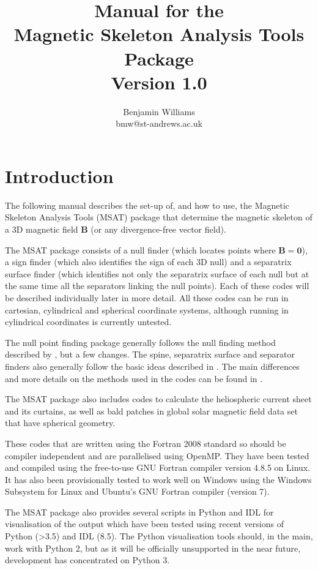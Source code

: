 \documentclass[12pt]{article}
\author{Benjamin Williams \\ bmw@st-andrews.ac.uk}
\title{Manual for the \\ Magnetic Skeleton Analysis Tools Package \\ \( \; \) \\ Version 1.0}
\renewcommand{\vec}[1]{\mathbf{#1}}
\begin{document}
  \maketitle

  \tableofcontents

  \newpage

  \section{Introduction}

    The following manual describes the set-up of, and how to use, the Magnetic Skeleton Analysis Tools (MSAT) package that determine the magnetic skeleton of a 3D magnetic field \( \vec{B} \) (or any divergence-free vector field).

    The MSAT package consists of a null finder (which locates points where \( \vec{B} = \vec{0} \)), a sign finder (which also identifies the sign of each 3D null) and a separatrix surface finder (which identifies not only the separatrix surface of each null but at the same time all the separators linking the null points). Each of these codes will be described individually later in more detail.  All these codes can be run in cartesian, cylindrical and spherical coordinate systems, although running in cylindrical coordinates is currently untested.

    The null point finding package generally follows the null finding method described by \textcite{Haynes2007}, but a few changes. The spine, separatrix surface and separator finders also generally follow the basic ideas described in \textcite{Haynes2007}. The main differences and more details on the methods used in the codes can be found in \textcite{WilliamsPhD2018}.

    The MSAT package also includes codes to calculate the heliospheric current sheet and its curtains, as well as bald patches in global solar magnetic field data set that have spherical geometry.

    These codes that are written using the Fortran 2008 standard so should be compiler independent and are parallelised using OpenMP. They have been tested and compiled using the free-to-use GNU Fortran compiler version 4.8.5 on Linux. It has also been provisionally tested to work well on Windows using the Windows Subsystem for Linux and Ubuntu's GNU Fortran compiler (version 7).

    The MSAT package also provides several scripts in Python and IDL for visualisation of the output which have been tested using recent versions of Python (\textgreater 3.5) and IDL (8.5). The Python visualisation tools should, in the main, work with Python 2, but as it will be officially unsupported in the near future, development has concentrated on Python 3.
\end{document}

